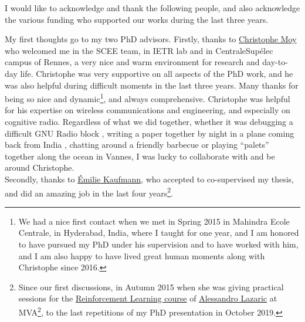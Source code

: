 
\begin{acknowledgements}


I would like to acknowledge and thank the following people, and also acknowledge the various funding who supported our works during the last three years.

My first thoughts go to my two PhD advisors.
%
Firstly, thanks to \href{https://MoyChristophe.Wordpress.com/}{Christophe Moy} who welcomed me in the SCEE team, in IETR lab and in CentraleSupélec campus of Rennes, a very nice and warm environment for research and day-to-day life.
Christophe was very supportive on all aspects of the PhD work, and he was also helpful during difficult moments in the last three years. Many thanks for being so nice and dynamic\footnote{We had a nice first contact when we met in Spring 2015 in Mahindra Ecole Centrale, in Hyderabad, India, where I taught for one year, and I am honored to have pursued my PhD under his supervision and to have worked with him, and I am also happy to have lived great human moments along with Christophe since 2016.}, and always comprehensive.
Christophe was helpful for his expertise on wireless communications and engineering, and especially on cognitive radio.
Regardless of what we did together, whether it was debugging a difficult GNU Radio block \cite{Besson2018ICT,Besson2019WCNC}, writing a paper together by night in a plane coming back from India \cite{MoyBesson2019}, chatting around a friendly barbecue or playing ``palets'' together along the ocean in Vannes, I was lucky to collaborate with and be around Christophe.\\
%
Secondly, thanks to \href{http://chercheurs.lille.inria.fr/ekaufman/research.html}{Émilie Kaufmann}, who accepted to co-supervised my thesis, and did an amazing job in the last four years\footnote{Since our first discussions, in Autumn 2015 when she was giving practical sessions for the \href{http://researchers.lille.inria.fr/~lazaric/Webpage/MVA-RL_Course15.html}{Reinforcement Learning course} of \href{http://researchers.lille.inria.fr/~lazaric/}{Alessandro Lazaric} at MVA\footnote{\href{http://math.ens-paris-saclay.fr/version-francaise/formations/master-mva/}{Master Mathématiques Vision Apprentissage} at \href{https://www.ens-paris-saclay.fr/}{ENS de Paris-Saclay}, previously named \href{https://www.ens-cachan.fr}{ENS de Cachan}.}, to the last repetitions of my PhD presentation in October 2019.}.

\end{acknowledgements}
